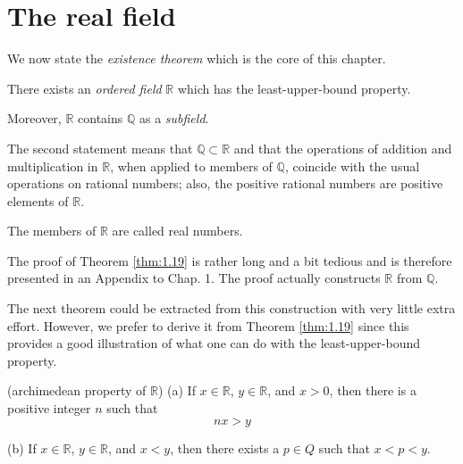 
\section{The real field}

We now state the \emph{existence theorem} which is the core of this chapter.

\begin{thm}\label{thm:1.19}
There exists an \emph{ordered field} $\mathbb{R}$ which has the least-upper-bound
property.

Moreover, $\mathbb{R}$ contains $\mathbb{Q}$ as a \emph{subfield}.
\end{thm}

The second statement means that $\mathbb{Q} \subset \mathbb{R}$ and that the operations of
addition and multiplication in $\mathbb{R}$, when applied to members of $\mathbb{Q}$, coincide with
the usual operations on rational numbers; also, the positive rational numbers
are positive elements of $\mathbb{R}$.

The members of $\mathbb{R}$ are called real numbers.

The proof of Theorem \ref{thm:1.19} is rather long and a bit tedious and is therefore
presented in an Appendix to Chap. 1. The proof actually constructs $\mathbb{R}$ from $\mathbb{Q}$.

The next theorem could be extracted from this construction with very
little extra effort. However, we prefer to derive it from Theorem \ref{thm:1.19} since this
provides a good illustration of what one can do with the least-upper-bound
property.


\begin{thm}\label{thm:1.20}(archimedean property of $\mathbb{R}$)
    (a) If $x \in \mathbb{R}$, $y \in \mathbb{R}$, and $x > 0$, then there is a positive integer $n$ such that
    \begin{equation*}
        nx > y
    \end{equation*}

    (b) If $x \in \mathbb{R}$, $y \in \mathbb{R}$, and $x < y$, then there exists a $p \in Q$ such that $x < p < y$.
\end{thm}

